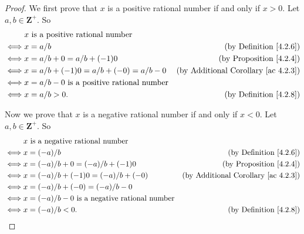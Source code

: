 \begin{proof}
    We first prove that \(x\) is a positive rational number if and only if \(x > 0\).
    Let \(a, b \in \mathbf{Z}^+\).
    So
    \begin{align*}
             & x \text{ is a positive rational number}                                                               \\
        \iff & x = a / b                                           & \text{(by Definition \ref{4.2.6})}              \\
        \iff & x = a / b + 0 = a / b + (-1)0                       & \text{(by Proposition \ref{4.2.4})}             \\
        \iff & x = a / b + (-1)0 = a / b + (-0) = a / b - 0        & \text{(by Additional Corollary \ref{ac 4.2.3})} \\
        \iff & x = a / b - 0 \text{ is a positive rational number}                                                   \\
        \iff & x = a / b > 0.                                      & \text{(by Definition \ref{4.2.8})}
    \end{align*}

    Now we prove that \(x\) is a negative rational number if and only if \(x < 0\).
    Let \(a, b \in \mathbf{Z}^+\).
    So
    \begin{align*}
             & x \text{ is a negative rational number}                                                                  \\
        \iff & x = (-a) / b                                           & \text{(by Definition \ref{4.2.6})}              \\
        \iff & x = (-a) / b + 0 = (-a) / b + (-1)0                    & \text{(by Proposition \ref{4.2.4})}             \\
        \iff & x = (-a) / b + (-1)0 = (-a) / b + (-0)                 & \text{(by Additional Corollary \ref{ac 4.2.3})} \\
        \iff & x = (-a) / b + (-0) = (-a) / b - 0                                                                       \\
        \iff & x = (-a) / b - 0 \text{ is a negative rational number}                                                   \\
        \iff & x = (-a) / b < 0.                                      & \text{(by Definition \ref{4.2.8})}
    \end{align*}
\end{proof}

